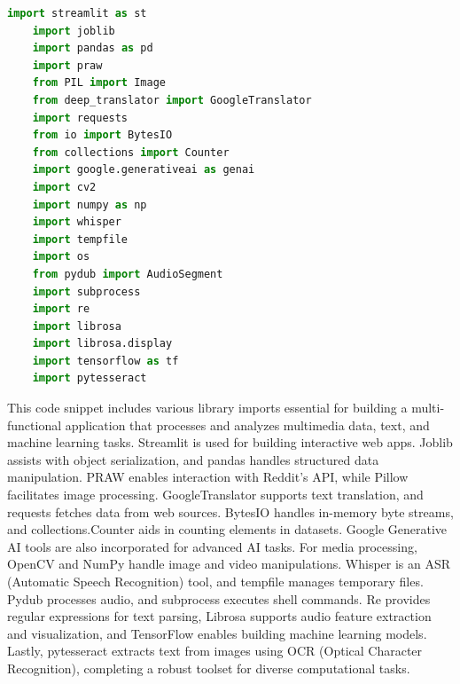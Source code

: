 \begin{tcolorbox}[colback=gray!5!white, colframe=gray!80!black, boxrule=0.5pt, title=Import Libraries]
    \begin{lstlisting}[language=Python]
    import streamlit as st
    import joblib
    import pandas as pd
    import praw
    from PIL import Image
    from deep_translator import GoogleTranslator
    import requests
    from io import BytesIO
    from collections import Counter
    import google.generativeai as genai
    import cv2
    import numpy as np
    import whisper
    import tempfile
    import os
    from pydub import AudioSegment
    import subprocess
    import re
    import librosa
    import librosa.display
    import tensorflow as tf
    import pytesseract
    \end{lstlisting}
\end{tcolorbox}

\noindent
This code snippet includes various library imports essential for building a multi-functional application that processes and analyzes multimedia data, text, and machine learning tasks. Streamlit is used for building interactive web apps. Joblib assists with object serialization, and pandas handles structured data manipulation. PRAW enables interaction with Reddit's API, while Pillow facilitates image processing. GoogleTranslator supports text translation, and requests fetches data from web sources. BytesIO handles in-memory byte streams, and collections.Counter aids in counting elements in datasets. Google Generative AI tools are also incorporated for advanced AI tasks. For media processing, OpenCV and NumPy handle image and video manipulations. Whisper is an ASR (Automatic Speech Recognition) tool, and tempfile manages temporary files. Pydub processes audio, and subprocess executes shell commands. Re provides regular expressions for text parsing, Librosa supports audio feature extraction and visualization, and TensorFlow enables building machine learning models. Lastly, pytesseract extracts text from images using OCR (Optical Character Recognition), completing a robust toolset for diverse computational tasks.

